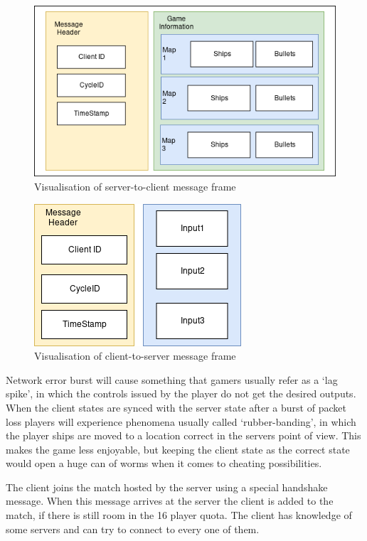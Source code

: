 \documentclass[10pt,a4paper]{article}
\begin{document}
 \begin{figure}
   \caption{Visualisation of server-to-client message frame}
   \includegraphics[scale=0.7]{serverMessageFrame.png}
 \end{figure}

 \begin{figure}
   \caption{Visualisation of client-to-server message frame}
   \includegraphics[scale=0.7]{clientMessageFrame.png}
 \end{figure}

 Network error burst will cause something that gamers usually refer as a `lag
 spike', in which the controls issued by the player do not get the desired
 outputs. When the client states are synced with the server state after a burst
 of packet loss players will experience phenomena usually called
 `rubber-banding', in which the player ships are moved to a location correct in
 the servers point of view. This makes the game less enjoyable, but keeping the
 client state as the correct state would open a huge can of worms when it comes
 to cheating possibilities. 

 The client joins the match hosted by the server using a special handshake message.
 When this message arrives at the server the client is added to the match, if
 there is still room in the 16 player quota. The client has knowledge of 
 some servers and can try to connect to every one of them.
\end{document}
